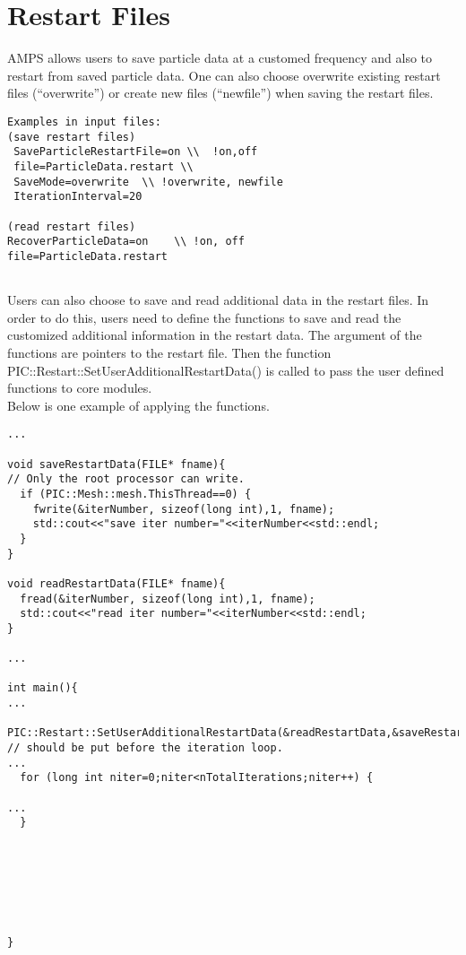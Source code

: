 \section {Restart Files}
AMPS allows users to save particle data at a customed frequency and also to restart from saved particle data. One can also choose overwrite existing restart files (``overwrite'') or create new files (``newfile'') when saving the restart files. \\
\begin{verbatim}
Examples in input files:
(save restart files)
 SaveParticleRestartFile=on \\  !on,off
 file=ParticleData.restart \\
 SaveMode=overwrite  \\ !overwrite, newfile
 IterationInterval=20

(read restart files)
RecoverParticleData=on    \\ !on, off
file=ParticleData.restart
 
\end{verbatim}
Users can also choose to save and read additional data in the restart files. In order to do this, users need to define the functions to save and read the customized additional information in the restart data. The argument of the functions are pointers to the restart file. Then the function PIC::Restart::SetUserAdditionalRestartData() is called to  pass the user defined functions to core modules. \\
Below is one example of applying the functions.
\begin{verbatim} 
...

void saveRestartData(FILE* fname){
// Only the root processor can write.
  if (PIC::Mesh::mesh.ThisThread==0) {
    fwrite(&iterNumber, sizeof(long int),1, fname);
    std::cout<<"save iter number="<<iterNumber<<std::endl;
  }
}

void readRestartData(FILE* fname){
  fread(&iterNumber, sizeof(long int),1, fname);
  std::cout<<"read iter number="<<iterNumber<<std::endl;
}

...

int main(){
...
 PIC::Restart::SetUserAdditionalRestartData(&readRestartData,&saveRestartData);         
// should be put before the iteration loop.
...
  for (long int niter=0;niter<nTotalIterations;niter++) {

...
  }







}

\end{verbatim}
